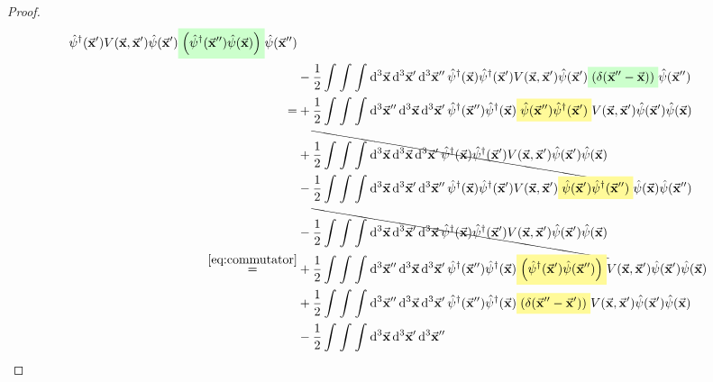\documentclass[11pt, a4paper, twoside, openright]{article}
\begin{document}
\begin{proof}
\begin{equation*}
\begin{split}
    \hat{\psi } ^\dag (\va{x}') V (\va{x},\va{x}') \hat{\psi } (\va{x}') \mathcolorbox{green!20}{ \qty(   \hat{\psi }^\dag (\va{x}'') \hat{\psi } (\va{x})  )} \hat{\psi }(\va{x}'') \\
    &-
    \frac{1}{2} \int_{}^{} \int_{}^{} \int_{}^{} \dd[3]{\va{x}} \dd[3]{\va{x}'} \dd[3]{\va{x}''}
    \hat{\psi } ^\dag (\va{x})
    \hat{\psi } ^\dag (\va{x}') V (\va{x},\va{x}') \hat{\psi } (\va{x}') \mathcolorbox{green!20}{ \qty( \delta (\va{x}''-\va{x}))} \hat{\psi }(\va{x}'') \\
    = &
    + \frac{1}{2} \int_{}^{} \int_{}^{} \int_{}^{} \dd[3]{\va{x}''} \dd[3]{\va{x}}  \dd[3]{\va{x}'}
    \hat{\psi }^\dag (\va{x}'')   \hat{\psi } ^\dag (\va{x}) \mathcolorbox{yellow!40}{\hat{\psi }(\va{x}'')
    \hat{\psi } ^\dag (\va{x}')} V (\va{x},\va{x}') \hat{\psi } (\va{x}') \hat{\psi } (\va{x}) \\
    &+
    \bcancel{
    \frac{1}{2} \int_{}^{} \int_{}^{} \int_{}^{} \dd[3]{\va{x}} \dd[3]{\va{x}}  \dd[3]{\va{x}'}
    \hat{\psi }^\dag (\va{x})
    \hat{\psi } ^\dag (\va{x}') V (\va{x},\va{x}') \hat{\psi } (\va{x}') \hat{\psi } (\va{x})
    } \\
    &-
    \frac{1}{2} \int_{}^{} \int_{}^{} \int_{}^{} \dd[3]{\va{x}} \dd[3]{\va{x}'} \dd[3]{\va{x}''}
    \hat{\psi } ^\dag (\va{x})
    \hat{\psi } ^\dag (\va{x}') V (\va{x},\va{x}') \mathcolorbox{yellow!40}{\hat{\psi } (\va{x}')   \hat{\psi }^\dag (\va{x}'') } \hat{\psi } (\va{x}) \hat{\psi }(\va{x}'') \\
    &-
    \bcancel{
    \frac{1}{2} \int_{}^{} \int_{}^{} \int_{}^{} \dd[3]{\va{x}} \dd[3]{\va{x}'} \dd[3]{\va{x}}
    \hat{\psi } ^\dag (\va{x})
    \hat{\psi } ^\dag (\va{x}') V (\va{x},\va{x}') \hat{\psi } (\va{x}')  \hat{\psi }(\va{x})
    } \\
    \overset{\eqref{eq:commutator}}{=} &
    + \frac{1}{2} \int_{}^{} \int_{}^{} \int_{}^{} \dd[3]{\va{x}''} \dd[3]{\va{x}}  \dd[3]{\va{x}'}
    \hat{\psi }^\dag (\va{x}'')   \hat{\psi } ^\dag (\va{x}) \mathcolorbox{yellow!40}{ \qty(  \hat{\psi } ^\dag (\va{x}')  \hat{\psi }(\va{x}'') )} V (\va{x},\va{x}') \hat{\psi } (\va{x}') \hat{\psi } (\va{x}) \\
    &+
    \frac{1}{2} \int_{}^{} \int_{}^{} \int_{}^{} \dd[3]{\va{x}''} \dd[3]{\va{x}}  \dd[3]{\va{x}'}
    \hat{\psi }^\dag (\va{x}'')   \hat{\psi } ^\dag (\va{x}) \mathcolorbox{yellow!40}{ \qty(\delta (\va{x}''-\va{x}') )} V (\va{x},\va{x}') \hat{\psi } (\va{x}') \hat{\psi } (\va{x})\\
    &-
    \frac{1}{2} \int_{}^{} \int_{}^{} \int_{}^{} \dd[3]{\va{x}} \dd[3]{\va{x}'} \dd[3]{\va{x}''}

\end{split}
\end{equation*}
\end{proof}
\end{document}
